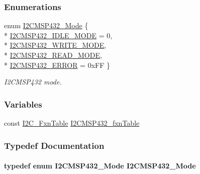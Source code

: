 \subsubsection*{Enumerations}
\begin{DoxyCompactItemize}
\item 
enum \hyperlink{_i2_c_m_s_p432_8h_aec46b533f0842a3ce99decddeaaadd74}{I2\+C\+M\+S\+P432\+\_\+\+Mode} \{ \\*
\hyperlink{_i2_c_m_s_p432_8h_aec46b533f0842a3ce99decddeaaadd74afc6335a249a0347053ba352185ca130c}{I2\+C\+M\+S\+P432\+\_\+\+I\+D\+L\+E\+\_\+\+M\+O\+D\+E} = 0, 
\\*
\hyperlink{_i2_c_m_s_p432_8h_aec46b533f0842a3ce99decddeaaadd74ae77d76671801eccda0056691bf1ce0fa}{I2\+C\+M\+S\+P432\+\_\+\+W\+R\+I\+T\+E\+\_\+\+M\+O\+D\+E}, 
\\*
\hyperlink{_i2_c_m_s_p432_8h_aec46b533f0842a3ce99decddeaaadd74adbda3366c7fbc1fe45fe2b41c62604d8}{I2\+C\+M\+S\+P432\+\_\+\+R\+E\+A\+D\+\_\+\+M\+O\+D\+E}, 
\\*
\hyperlink{_i2_c_m_s_p432_8h_aec46b533f0842a3ce99decddeaaadd74ae087b2921fcca8b15c84a1e99c8d29be}{I2\+C\+M\+S\+P432\+\_\+\+E\+R\+R\+O\+R} = 0x\+F\+F
 \}
\begin{DoxyCompactList}\small\item\em I2\+C\+M\+S\+P432 mode. \end{DoxyCompactList}\end{DoxyCompactItemize}
\subsubsection*{Variables}
\begin{DoxyCompactItemize}
\item 
const \hyperlink{struct_i2_c___fxn_table}{I2\+C\+\_\+\+Fxn\+Table} \hyperlink{_i2_c_m_s_p432_8h_ac37ce573655ee78327e304ed2b16a268}{I2\+C\+M\+S\+P432\+\_\+fxn\+Table}
\end{DoxyCompactItemize}


\subsubsection{Typedef Documentation}
\paragraph[{I2\+C\+M\+S\+P432\+\_\+\+Mode}]{\setlength{\rightskip}{0pt plus 5cm}typedef enum {\bf I2\+C\+M\+S\+P432\+\_\+\+Mode}  {\bf I2\+C\+M\+S\+P432\+\_\+\+Mode}}\label{_i2_c_m_s_p432_8h_a488555a795063972a9c74832de86c5f7}


